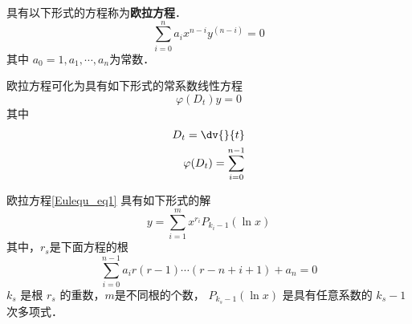 
\begin{issues}
\issueDraft
\end{issues}

具有以下形式的方程称为\textbf{欧拉方程}．
\begin{equation}\label{Eulequ_eq1}
\sum_{i=0}^{n}a_ix^{n-i}y^{(n-i)}=0
\end{equation}
其中 $a_0=1,a_1,\cdots,a_n$为常数．

欧拉方程可化为具有如下形式的常系数线性方程
\begin{equation}
\varphi(D_t)y=0
\end{equation}
其中
\begin{equation}
\begin{aligned}
D_t=\dv{}{t}\\
\varphi(D_t)=\sum_{i=0}^{n-1}
\end{aligned}
\end{equation}

欧拉方程\autoref{Eulequ_eq1} 具有如下形式的解
\begin{equation}
y=\sum_{i=1}^mx^{r_i}P_{k_i-1}(\ln x)
\end{equation}
其中，$r_s$是下面方程的根
\begin{equation}
\sum_{i=0}^{n-1}a_ir(r-1)\cdots(r-n+i+1)+a_n=0
\end{equation}
$k_s$ 是根 $r_s$ 的重数，$m$是不同根的个数， $P_{k_s-1}(\ln x)$ 是具有任意系数的 $k_s-1$ 次多项式． 
